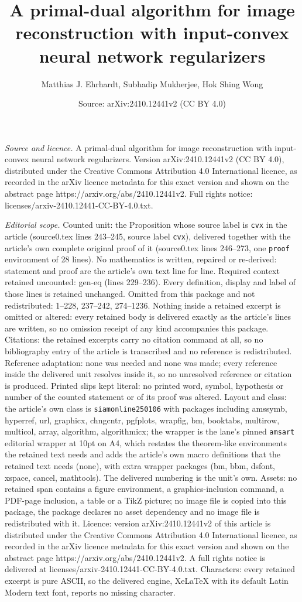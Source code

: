 \documentclass[10pt,a4paper]{amsart}
\title[A primal-dual algorithm for image reconstruction with input-]{A primal-dual algorithm for image reconstruction with input-convex neural network regularizers}
\author{Matthias J. Ehrhardt, Subhadip Mukherjee, Hok Shing Wong}
\date{Source: arXiv:2410.12441v2 (CC BY 4.0)}
\begin{document}
\maketitle

\noindent\emph{Source and licence.} A primal-dual algorithm for image reconstruction with input-convex neural network regularizers. Version arXiv:2410.12441v2 (CC BY 4.0), distributed under the Creative Commons Attribution 4.0 International licence, as recorded in the arXiv licence metadata for this exact version and shown on the abstract page https://arxiv.org/abs/2410.12441v2. Full rights notice: licenses/arxiv-2410.12441-CC-BY-4.0.txt.\par\smallskip

\noindent\textit{Editorial scope.} Counted unit: the Proposition whose source label is \texttt{cvx} in the article (source0.tex lines 243--245, source label \texttt{cvx}), delivered together with the article's own complete original proof of it (source0.tex lines 246--273, one \texttt{proof} environment of 28 lines). No mathematics is written, repaired or re-derived: statement and proof are the article's own text line for line. Required context retained uncounted: gen-eq (lines 229--236). Every definition, display and label of those lines is retained unchanged. Omitted from this package and not redistributed: 1--228, 237--242, 274--1236. Nothing inside a retained excerpt is omitted or altered: every retained body is delivered exactly as the article's lines are written, so no omission receipt of any kind accompanies this package. Citations: the retained excerpts carry no citation command at all, so no bibliography entry of the article is transcribed and no reference is redistributed. Reference adaptation: none was needed and none was made; every reference inside the delivered unit resolves inside it, so no unresolved reference or citation is produced. Printed slips kept literal: no printed word, symbol, hypothesis or number of the counted statement or of its proof was altered. Layout and class: the article's own class is \texttt{siamonline250106} with packages including amssymb, hyperref, url, graphicx, chngcntr, pgfplots, wrapfig, bm, booktabs, multirow, multicol, array, algorithm, algorithmicx; the wrapper is the lane's pinned \texttt{amsart} editorial wrapper at 10pt on A4, which restates the theorem-like environments the retained text needs and adds the article's own macro definitions that the retained text needs (none), with extra wrapper packages (bm, bbm, dsfont, xspace, cancel, mathtools). The delivered numbering is the unit's own. Assets: no retained span contains a figure environment, a graphics-inclusion command, a PDF-page inclusion, a table or a TikZ picture; no image file is copied into this package, the package declares no asset dependency and no image file is redistributed with it. Licence: version arXiv:2410.12441v2 of this article is distributed under the Creative Commons Attribution 4.0 International licence, as recorded in the arXiv licence metadata for this exact version and shown on the abstract page https://arxiv.org/abs/2410.12441v2. A full rights notice is delivered at licenses/arxiv-2410.12441-CC-BY-4.0.txt. Characters: every retained excerpt is pure ASCII, so the delivered engine, XeLaTeX with its default Latin Modern text font, reports no missing character.
\end{document}
